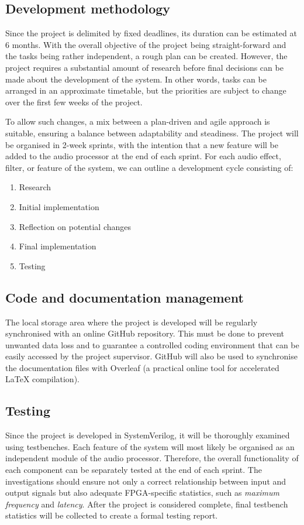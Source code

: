 \subsection*{Development methodology}
Since the project is delimited by fixed deadlines, its duration can be estimated at 6 months. With the overall objective of the project being straight-forward and the tasks being rather independent, a rough plan can be created. However, the project requires a substantial amount of research before final decisions can be made about the development of the system. In other words, tasks can be arranged in an approximate timetable, but the priorities are subject to change over the first few weeks of the project.

To allow such changes, a mix between a plan-driven and agile approach is suitable, ensuring a balance between adaptability and steadiness. The project will be organised in 2-week sprints, with the intention that a new feature will be added to the audio processor at the end of each sprint. For each audio effect, filter, or feature of the system, we can outline a development cycle consisting of:
\begin{enumerate}
    \item Research
    \item Initial implementation
    \item Reflection on potential changes
    \item Final implementation
    \item Testing
\end{enumerate}


\subsection*{Code and documentation management}
The local storage area where the project is developed will be regularly synchronised with an online GitHub repository. This must be done to prevent unwanted data loss and to guarantee a controlled coding environment that can be easily accessed by the project supervisor.
GitHub will also be used to synchronise the documentation files with Overleaf\cite{overleaf} (a practical online tool for accelerated LaTeX compilation).

\subsection*{Testing}
Since the project is developed in SystemVerilog, it will be thoroughly examined using testbenches. Each feature of the system will most likely be organised as an independent module of the audio processor. Therefore, the overall functionality of each component can be separately tested at the end of each sprint. The investigations should ensure not only a correct relationship between input and output signals but also adequate FPGA-specific statistics, such as \textit{maximum frequency} and \textit{latency}. After the project is considered complete, final testbench statistics will be collected to create a formal testing report.

